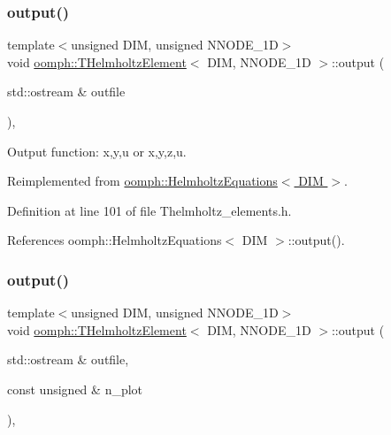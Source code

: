 \subsubsection{\texorpdfstring{output()}{output()}\hspace{0.1cm}{\footnotesize\ttfamily [1/4]}}
{\footnotesize\ttfamily template$<$unsigned D\+IM, unsigned N\+N\+O\+D\+E\+\_\+1D$>$ \\
void \hyperlink{classoomph_1_1THelmholtzElement}{oomph\+::\+T\+Helmholtz\+Element}$<$ D\+IM, N\+N\+O\+D\+E\+\_\+1D $>$\+::output (\begin{DoxyParamCaption}\item[{std\+::ostream \&}]{outfile }\end{DoxyParamCaption})\hspace{0.3cm}{\ttfamily [inline]}, {\ttfamily [virtual]}}



Output function\+: x,y,u or x,y,z,u. 



Reimplemented from \hyperlink{classoomph_1_1HelmholtzEquations_ad06140cef8a602246cf45f1b38d201e3}{oomph\+::\+Helmholtz\+Equations$<$ D\+I\+M $>$}.



Definition at line 101 of file Thelmholtz\+\_\+elements.\+h.



References oomph\+::\+Helmholtz\+Equations$<$ D\+I\+M $>$\+::output().

\mbox{\label{classoomph_1_1THelmholtzElement_ad16215e9aac2518284b9e5a0b8b535d1}} 
\subsubsection{\texorpdfstring{output()}{output()}\hspace{0.1cm}{\footnotesize\ttfamily [2/4]}}
{\footnotesize\ttfamily template$<$unsigned D\+IM, unsigned N\+N\+O\+D\+E\+\_\+1D$>$ \\
void \hyperlink{classoomph_1_1THelmholtzElement}{oomph\+::\+T\+Helmholtz\+Element}$<$ D\+IM, N\+N\+O\+D\+E\+\_\+1D $>$\+::output (\begin{DoxyParamCaption}\item[{std\+::ostream \&}]{outfile,  }\item[{const unsigned \&}]{n\+\_\+plot }\end{DoxyParamCaption})\hspace{0.3cm}{\ttfamily [inline]}, {\ttfamily [virtual]}}



